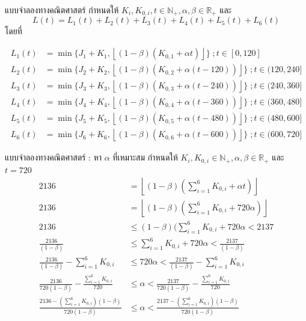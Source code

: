 \documentclass{beamer}
\begin{document}
\begin{frame}{แบบจำลองทางคณิตศาสตร์} 
กำหนดให้ $ K_i , K_{0,i} , t \in \mathbb{N}_+ , \alpha , \beta \in \mathbb{R}_+ $ และ 
$$ L(t) = L_1(t) + L_2(t) + L_3(t) + L_4(t) + L_5(t) + L_6(t) $$
โดยที่ 
\begin{center}
\begin{align*}
L_1(t) & = \min \{J_1 + K_1, \left\lfloor (1 - \beta)(K_{0,1} + \alpha{t}) \right\rfloor\} \; ; t \in [0,120] \\
L_2(t) & = \min \{J_2 + K_2, \left\lfloor (1 - \beta)(K_{0,2} + \alpha{(t - 120)}) \right\rfloor\} \; ; t \in (120,240] \\
L_3(t) & = \min \{J_3 + K_3, \left\lfloor (1 - \beta)(K_{0,3} + \alpha{(t - 240)}) \right\rfloor\} \; ; t \in (240,360] \\
L_4(t) & = \min \{J_4 + K_4, \left\lfloor (1 - \beta)(K_{0,4} + \alpha{(t - 360)}) \right\rfloor\} \; ; t \in (360,480] \\
L_5(t) & = \min \{J_5 + K_5, \left\lfloor (1 - \beta)(K_{0,5} + \alpha{(t - 480)}) \right\rfloor\} \; ; t \in (480,600] \\
L_6(t) & = \min \{J_6 + K_6, \left\lfloor (1 - \beta)(K_{0,6} + \alpha{(t - 600)}) \right\rfloor\} \; ; t \in (600,720]
\end{align*}
\end{center}
\end{frame}

\begin{frame}{แบบจำลองทางคณิตศาสตร์ : หา $\alpha$ ที่เหมาะสม }
กำหนดให้ $ K_i , K_{0,i} \in \mathbb{N}_+ , \alpha , \beta \in \mathbb{R}_+ $ และ $t = 720$
{\tiny 
\begin{align*}
2136 & = \left\lfloor(1 - \beta)(\sum_{i=1}^{6} K_{0,i} + \alpha{t})\right\rfloor\ \\
2136 & = \left\lfloor(1 - \beta)(\sum_{i=1}^{6} K_{0,i} + 720\alpha)\right\rfloor\ \\
2136 & \leq (1 - \beta)(\sum_{i=1}^{6} K_{0,i} + 720\alpha < 2137 \\
\frac{2136}{(1 - \beta)} & \leq \sum_{i=1}^{6} K_{0,i} + 720\alpha < \frac{2137}{(1 - \beta)} \\
\frac{2136}{(1 - \beta)} - \sum_{i=1}^{6} K_{0,i} & \leq 720\alpha < \frac{2137}{(1 - \beta)} - \sum_{i=1}^{6} K_{0,i} \\
\frac{2136}{720(1 - \beta)} - \frac{\sum_{i=1}^{6} K_{0,i}}{720} & \leq \alpha < \frac{2137}{720(1 - \beta)} - \frac{\sum_{i=1}^{6} K_{0,i}}{720} \\ 
\frac{2136 - (\sum_{i=1}^{6} K_{0,i})(1 - \beta)}{720(1 - \beta)} & \leq \alpha < \frac{2137 - (\sum_{i=1}^{6} K_{0,i})(1 - \beta)}{720(1 - \beta)}
\end{align*}
}%
\end{frame}
\end{document}
